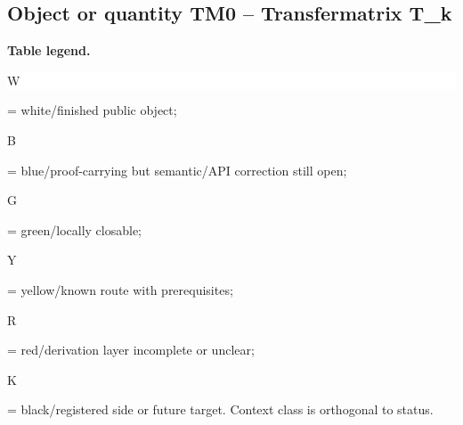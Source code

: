 \subsection*{Object or quantity TM0 -- Transfermatrix T\_k}
\hypertarget{objproof:TM0}{}
\par\smallskip\noindent\begin{minipage}{0.99\linewidth}\footnotesize\raggedright\textbf{Table legend.} \colorbox{white}{\strut W} = white/finished public object; \colorbox{cyan!20}{\strut B} = blue/proof-carrying but semantic/API correction still open; \colorbox{green!18}{\strut G} = green/locally closable; \colorbox{yellow!25}{\strut Y} = yellow/known route with prerequisites; \colorbox{red!20}{\strut R} = red/derivation layer incomplete or unclear; \colorbox{black!18}{\strut K} = black/registered side or future target. Context class is orthogonal to status.\end{minipage}\par\vspace{0.25em}
